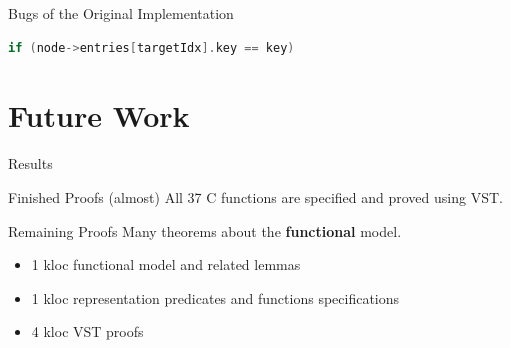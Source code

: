 \documentclass[page number,usenames,dvipsnames]{beamer}
\begin{document}
{\begin{frame}[standout]
    \end{frame}

}

\begin{frame}[fragile]{Bugs of the Original Implementation}
  \begin{lstlisting}[language=C]
if (node->entries[targetIdx].key == key)
  \end{lstlisting}
  \vfill
  \bugcursor
\end{frame}

\section{Future Work}
\begin{frame}{Results}

  \begin{exampleblock}{Finished Proofs}
    {\color{Gray}(almost)} All 37 C functions are specified and proved using VST.
  \end{exampleblock}
  \vfill
  \begin{alertblock}{Remaining Proofs}
    Many theorems about the \textbf{functional} model.
  \end{alertblock}
  \vfill
  \begin{itemize}
  \item 1 kloc functional model and related lemmas
  \item 1 kloc representation predicates and functions specifications
  \item 4 kloc VST proofs
  \end{itemize}
  
\end{frame}
\end{document}
